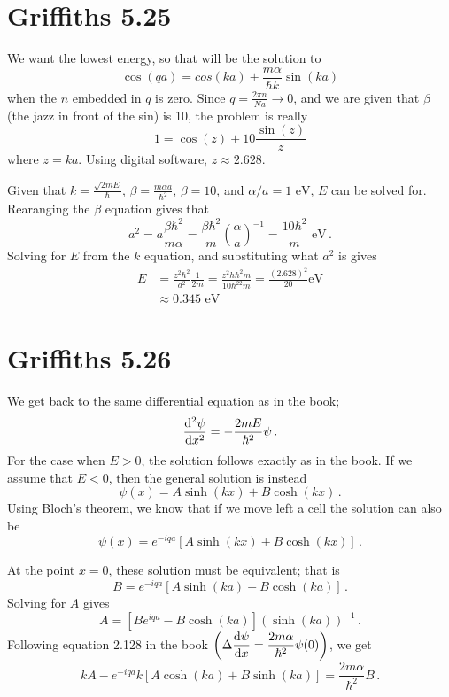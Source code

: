 \documentclass[11pt]{article}
\begin{document}
\newpage

\section*{Griffiths 5.25}
We want the lowest energy, so that will be the solution to 
\[\cos(qa) = cos(ka)+ \frac{m\alpha}{\hbar k}\sin(ka)\]
when the $n$ embedded in $q$ is zero. Since $\displaystyle{q = \frac{2\pi n}{Na} \rightarrow 0}$, and we are given that $\beta$ (the jazz in front of the sin) is 10, the problem is really
\[1 = \cos(z) + 10 \frac{\sin(z)}{z}\]
where $z = ka$. Using digital software, $z \approx 2.628$. 

Given that $\displaystyle{k = \frac{\sqrt{2mE}}{\hbar}}$, $\displaystyle{\beta = \frac{m\alpha a}{\hbar^2}}$, $\beta = 10$, and $\alpha / a = 1 \text{ eV}$, $E$ can be solved for. Rearanging the $\beta$ equation gives that 
\[a^2 = a \frac{\beta \hbar^2}{m\alpha} = \frac{\beta \hbar^2}{m}\left(\frac{\alpha}{a}\right)^{-1} = \frac{10 \hbar^2}{m} \text{ eV} \, .\]
Solving for $E$ from the $k$ equation, and substituting what $a^2$ is gives
\begin{align*}
E & = \frac{z^2\hbar^2}{a^2}\frac{1}{2m} = \frac{z^2h\hbar^2m}{10\hbar^22m} = \frac{(2.628)^2}{20}\text{eV}\\
& \approx \boxed{0.345 \text{ eV}}
\end{align*}

\newpage

\section*{Griffiths 5.26}
We get back to the same differential equation as in the book; 
\[\dv[2]{\psi}{x} = -\frac{2mE}{\hbar^2}\psi \, .\]
For the case when $E>0$, the solution follows exactly as in the book. If we assume that $E<0$, then the general solution is instead 
\[\psi(x) = A\sinh(kx) + B\cosh(kx) \, . \]
Using Bloch's theorem, we know that if we move left a cell the solution can also be
\[\psi(x) = e^{-iqa}\left[A\sinh(kx) + B\cosh(kx)\right] \, . \]

At the point $x=0$, these solution must be equivalent; that is
\[B = e^{-iqa}\left[A\sinh(ka) + B\cosh(ka)\right] \, .\]
Solving for $A$ gives
\[A = \left[Be^{iqa} - B\cosh(ka)\right]\left(\sinh(ka)\right)^{-1} \, .\]
Following equation 2.128 in the book $\displaystyle{\left(\Delta\dv{\psi}{x} = \frac{2m\alpha}{\hbar^2}\psi(0)\right)}$, we get
\[kA - e^{-iqa}k\left[A\cosh(ka) + B\sinh(ka)\right] = \frac{2m\alpha}{\hbar^2}B \, .\]
\end{document}
